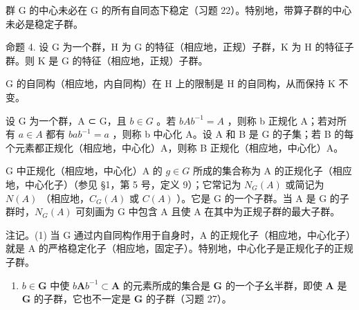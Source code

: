 群 G 的中心未必在 G 的所有自同态下稳定（习题 22）。特别地，带算子群的中心未必是稳定子群。

命题 4. 设 G 为一个群，H 为 G 的特征（相应地，正规）子群，K 为 H 的特征子群。则 K 是 G 的特征（相应地，正规）子群。

G 的自同构（相应地，内自同构）在 H 上的限制是 H 的自同构，从而保持 K 不变。

设 G 为一个群，A ⊂ G，且 \(b \in G\) 。若 \(bAb^{-1} = A\) ，则称 b 正规化 A；若对所有 \(a \in A\) 都有 \(bab^{-1} = a\) ，则称 b 中心化 A。设 A 和 B 是 G 的子集；若 B 的每个元素都正规化（相应地，中心化）A，则称 B 正规化（相应地，中心化）A。

G 中正规化（相应地，中心化）A 的 \(g \in G\) 所成的集合称为 A 的正规化子（相应地，中心化子）（参见 §1，第 5 号，定义 9）；它常记为 \(N_{G}(A)\) 或简记为 \(N(A)\) （相应地，\(C_{G}(A)\) 或 \(C(A)\) ）。它是 G 的一个子群。当 A 是 G 的子群时，\(N_{G}(A)\) 可刻画为 G 中包含 A 且使 A 在其中为正规子群的最大子群。

注记。(1) 当 G 通过内自同构作用于自身时，A 的正规化子（相应地，中心化子）就是 A 的严格稳定化子（相应地，固定子）。特别地，中心化子是正规化子的正规子群。

\begin{enumerate}
\def\labelenumi{(\arabic{enumi})}
\setcounter{enumi}{1}
\tightlist
\item
  \(b \in \mathbf{G}\) 中使 \(b\mathbf{A}b^{-1} \subset \mathbf{A}\) 的元素所成的集合是 \(\mathbf{G}\) 的一个子幺半群，即使 \(\mathbf{A}\) 是 \(\mathbf{G}\) 的子群，它也不一定是 \(\mathbf{G}\) 的子群（习题 27）。
\end{enumerate}


